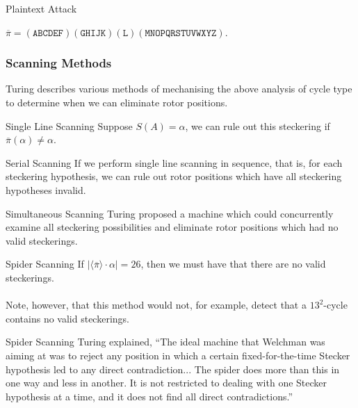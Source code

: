 \documentclass[hyphens,aspectratio=169]{beamer}
\begin{document}
\begin{frame}[fragile]{Plaintext Attack}
\large
	\begin{center}
		$\overline\pi =
			(\texttt{ABCDEF})(\texttt{GHIJK})(\texttt{L})(\texttt{MNOPQRSTUVWXYZ})$.
	\end{center}
\end{frame}

\begin{frame}
	\frametitle{Scanning Methods
	}
	\large
	Turing describes various methods of mechanising the above analysis of cycle type to determine when we can eliminate rotor positions.
\end{frame}

\begin{frame}{Single Line Scanning}
	Suppose $S(A) = \alpha$, we can rule out this steckering if $\overline\pi(\alpha
		) \ne \alpha$.
\end{frame}

\begin{frame}{Serial Scanning}
	If we perform single line scanning in sequence, that is, for each steckering hypothesis, we can rule out rotor positions which have all steckering hypotheses invalid.
\end{frame}

\begin{frame}{Simultaneous Scanning}
	Turing proposed a machine which could concurrently examine all steckering possibilities and eliminate rotor positions
	which had no valid steckerings.

\end{frame}

\begin{frame}{Spider Scanning}
	If $|\langle\overline\pi\rangle\cdot\alpha| = 26$, then we must have that there are no valid steckerings.
	\\\\Note, however, that this method
	would not, for example, detect that a $13^{2}$-cycle contains no valid steckerings.
\end{frame}

\begin{frame}{Spider Scanning}
	Turing explained, ``The ideal machine that Welchman was aiming at was to reject any position in which a certain fixed-for-the-time Stecker hypothesis led to any direct contradiction... The spider does more than this in one way and
	less in another. It is not restricted to dealing with one Stecker hypothesis at a time, and it does not find all direct contradictions.''
\end{frame}
\end{document}
